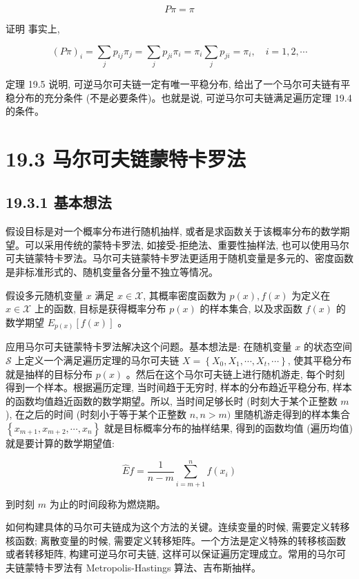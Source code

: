 \documentclass[10pt]{article}
\begin{document}
\begin{CJK*}{UTF8}{bsmi}
$$
P \pi=\pi
$$

证明 事实上,


\begin{equation*}
(P \pi)_{i}=\sum_{j} p_{i j} \pi_{j}=\sum_{j} p_{j i} \pi_{i}=\pi_{i} \sum_{j} p_{j i}=\pi_{i}, \quad i=1,2, \cdots \tag{19.31}
\end{equation*}


定理 19.5 说明, 可逆马尔可夫链一定有唯一平稳分布, 给出了一个马尔可夫链有平稳分布的充分条件 (不是必要条件)。也就是说, 可逆马尔可夫链满足遍历定理 19.4 的条件。

\section*{19.3 马尔可夫链蒙特卡罗法}
\subsection*{19.3.1 基本想法}
假设目标是对一个概率分布进行随机抽样, 或者是求函数关于该概率分布的数学期望。可以采用传统的蒙特卡罗法, 如接受-拒绝法、重要性抽样法, 也可以使用马尔可夫链蒙特卡罗法。马尔可夫链蒙特卡罗法更适用于随机变量是多元的、密度函数是非标准形式的、随机变量各分量不独立等情况。

假设多元随机变量 $x$ 满足 $x \in \mathcal{X}$, 其概率密度函数为 $p(x), f(x)$ 为定义在 $x \in \mathcal{X}$ 上的函数, 目标是获得概率分布 $p(x)$ 的样本集合, 以及求函数 $f(x)$ 的数学期望 $E_{p(x)}[f(x)]$ 。

应用马尔可夫链蒙特卡罗法解决这个问题。基本想法是: 在随机变量 $x$ 的状态空间 $\mathcal{S}$ 上定义一个满足遍历定理的马尔可夫链 $X=\left\{X_{0}, X_{1}, \cdots, X_{t}, \cdots\right\}$, 使其平稳分布就是抽样的目标分布 $p(x)$ 。然后在这个马尔可夫链上进行随机游走, 每个时刻得到一个样本。根据遍历定理, 当时间趋于无穷时, 样本的分布趋近平稳分布, 样本的函数均值趋近函数的数学期望。所以, 当时间足够长时 (时刻大于某个正整数 $m$ ), 在之后的时间 (时刻小于等于某个正整数 $n, n>m)$ 里随机游走得到的样本集合 $\left\{x_{m+1}, x_{m+2}, \cdots, x_{n}\right\}$ 就是目标概率分布的抽样结果, 得到的函数均值 (遍历均值) 就是要计算的数学期望值:


\begin{equation*}
\hat{E} f=\frac{1}{n-m} \sum_{i=m+1}^{n} f\left(x_{i}\right) \tag{19.32}
\end{equation*}


到时刻 $m$ 为止的时间段称为燃烧期。

如何构建具体的马尔可夫链成为这个方法的关键。连续变量的时候, 需要定义转移核函数; 离散变量的时候, 需要定义转移矩阵。一个方法是定义特殊的转移核函数或者转移矩阵, 构建可逆马尔可夫链, 这样可以保证遍历定理成立。常用的马尔可夫链蒙特卡罗法有 Metropolis-Hastings 算法、吉布斯抽样。


\end{CJK*}
\end{document}
